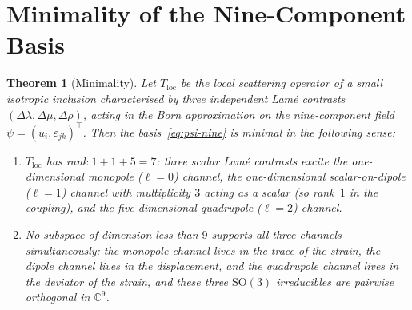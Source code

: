 \documentclass[11pt,a4paper]{article}
\newcommand{\eps}{\varepsilon}
\theoremstyle{plain}
\newtheorem{theorem}[proposition]{Theorem}
\theoremstyle{definition}
\theoremstyle{remark}
\begin{document}
\section{Minimality of the Nine-Component Basis}\label{sec:minimality}
\begin{theorem}[Minimality]\label{thm:minimal}
Let $T_{\text{loc}}$ be the local scattering operator of a small
isotropic inclusion characterised by three independent Lam\'e
contrasts $(\Delta\lambda,\Delta\mu,\Delta\rho)$, acting in the Born
approximation on the nine-component field
$\psi=(u_i,\eps_{jk})^\top$.  Then the basis~\eqref{eq:psi-nine} is
minimal in the following sense:
\begin{enumerate}[label=(\roman*)]
  \item $T_{\text{loc}}$ has rank $1+1+5=7$: three scalar Lam\'e
  contrasts excite the one-dimensional monopole ($\ell=0$) channel,
  the one-dimensional scalar-on-dipole ($\ell=1$) channel with
  multiplicity $3$ acting as a scalar (so rank~$1$ in the coupling),
  and the five-dimensional quadrupole ($\ell=2$) channel.
  \item No subspace of dimension less than $9$ supports all three
  channels simultaneously: the monopole channel lives in the trace of
  the strain, the dipole channel lives in the displacement, and the
  quadrupole channel lives in the deviator of the strain, and these
  three $\mathrm{SO}(3)$ irreducibles are pairwise orthogonal in
  $\mathbb{C}^9$.
\end{enumerate}
\end{theorem}
\end{document}
